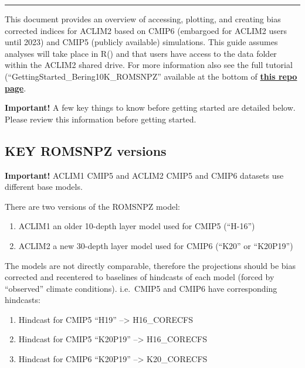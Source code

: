 \documentclass[
]{article}
\providecommand{\tightlist}{%
  \setlength{\itemsep}{0pt}\setlength{\parskip}{0pt}}
\begin{document}
\begin{center}\rule{0.5\linewidth}{0.5pt}\end{center}

This document provides an overview of accessing, plotting, and creating
bias corrected indices for ACLIM2 based on CMIP6 (embargoed for ACLIM2
users until 2023) and CMIP5 (publicly available) simulations. This guide
assumes analyses will take place in R() and that users have access to
the data folder within the ACLIM2 shared drive. For more information
also see the full tutorial (``GettingStarted\_Bering10K\_ROMSNPZ''
available at the bottom of
\href{https://github.com/kholsman/ACLIM2}{\textbf{this repo page}}.

\textbf{Important!} A few key things to know before getting started are
detailed below. Please review this information before getting started.

\hypertarget{key-romsnpz-versions}{%
\subsection{KEY ROMSNPZ versions}\label{key-romsnpz-versions}}

\textbf{Important!} ACLIM1 CMIP5 and ACLIM2 CMIP5 and CMIP6 datasets use
different base models.

There are two versions of the ROMSNPZ model:

\begin{enumerate}
\def\labelenumi{\arabic{enumi}.}
\tightlist
\item
  ACLIM1 an older 10-depth layer model used for CMIP5 (``H-16'')
\item
  ACLIM2 a new 30-depth layer model used for CMIP6 (``K20'' or
  ``K20P19'')
\end{enumerate}

The models are not directly comparable, therefore the projections should
be bias corrected and recentered to baselines of hindcasts of each model
(forced by ``observed'' climate conditions). i.e.~CMIP5 and CMIP6 have
corresponding hindcasts:

\begin{enumerate}
\def\labelenumi{\arabic{enumi}.}
\tightlist
\item
  Hindcast for CMIP5 ``H19'' --\textgreater{} H16\_CORECFS
\item
  Hindcast for CMIP5 ``K20P19'' --\textgreater{} H16\_CORECFS
\item
  Hindcast for CMIP6 ``K20P19'' --\textgreater{} K20\_CORECFS
\end{enumerate}
\end{document}
